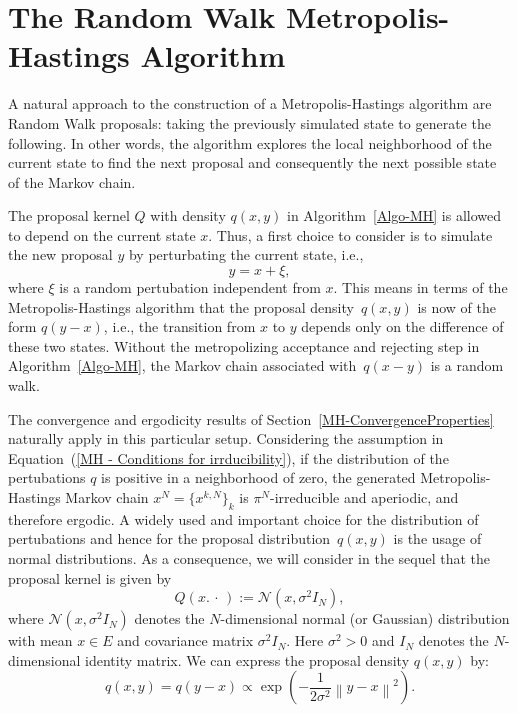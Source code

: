 \section{The Random Walk Metropolis-Hastings Algorithm}
\label{MH-RWM}

A natural approach to the construction of a Metropolis-Hastings algorithm are Random Walk proposals: taking the previously simulated state to generate the following. In other words, the algorithm explores the local neighborhood of the current state to find the next proposal and consequently the next possible state of the Markov chain.

The proposal kernel $Q$ with density $ q(x,y) $ in Algorithm~\ref{Algo-MH} is allowed to depend on the current state $x$. Thus, a first choice to consider is to simulate the new proposal $ y $ by perturbating the current state, i.e.,
\begin{equation}
 \label{MH-RWM:RWM-proposals, First choice}
 y = x + \xi,
\end{equation}
where $ \xi $ is a random pertubation independent from $ x $. This means in terms of the Metropolis-Hastings algorithm that the proposal density~$ q(x,y) $ is now of the form $ q(y-x) $, i.e., the transition from $x$ to $y$ depends only on the difference of these two states. Without the metropolizing acceptance and rejecting step in Algorithm~\ref{Algo-MH}, the Markov chain associated with~$q(x-y)$ is a random walk.


The convergence and ergodicity results of Section~\ref{MH-ConvergenceProperties} naturally apply in this particular setup. Considering the assumption in Equation~(\ref{MH - Conditions for irrducibility}), if the distribution of the pertubations $q$ is positive in a neighborhood of zero, the generated Metropolis-Hastings Markov chain $ x^{N} = \{ x^{k,N} \}_{k} $ is $ \pi^{N} $-irreducible and aperiodic, and therefore ergodic. A widely used and important choice for the distribution of pertubations and hence for the proposal distribution~$ q(x,y) $ is the usage of normal distributions. As a consequence, we will consider in the sequel that the proposal kernel is given by
\begin{equation}
\label{RWM-GaussianProposalKernel}
 Q(x. \, \cdot \,) := \mathcal{N}(x, \sigma^2 I_{N} ),
\end{equation}
where $ \mathcal{N}(x, \sigma^2 I_{N} ) $ denotes the $N$-dimensional normal (or Gaussian) distribution with mean $x \in E$ and covariance matrix $ \sigma^2 I_{N} $. Here $ \sigma^2 > 0 $ and $ I_{N} $ denotes the $N$-dimensional identity matrix. We can express the proposal density $ q(x,y) $ by:
\begin{equation}
 q(x,y) = q(y-x) \varpropto  \exp{ \left( - \frac{1}{2 \sigma^2} \left\| y-x \right\|^2  \right) }.
\end{equation}

